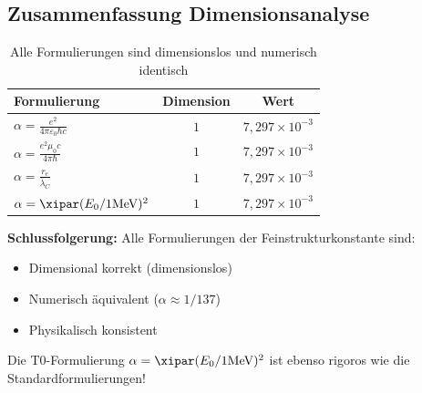 	\subsection{Zusammenfassung Dimensionsanalyse}
	
	\begin{table}[h]
		\centering
		\begin{tabular}{|l|c|c|}
			\hline
			\textbf{Formulierung} & \textbf{Dimension} & \textbf{Wert} \\
			\hline
			$\alpha = \frac{e^2}{4\pi\varepsilon_0\hbar c}$ & $1$ & $7{,}297 \times 10^{-3}$ \\
			$\alpha = \frac{e^2\mu_0 c}{4\pi\hbar}$ & $1$ & $7{,}297 \times 10^{-3}$ \\
			$\alpha = \frac{r_e}{\bar\lambda_C}$ & $1$ & $7{,}297 \times 10^{-3}$ \\
			$\alpha = \xipar(E_0/1\text{MeV})^2$ & $1$ & $7{,}297 \times 10^{-3}$ \\
			\hline
		\end{tabular}
		\caption{Alle Formulierungen sind dimensionslos und numerisch identisch}
	\end{table}
	
	\textbf{Schlussfolgerung:} Alle Formulierungen der Feinstrukturkonstante sind:
	\begin{itemize}
		\item Dimensional korrekt (dimensionslos)
		\item Numerisch äquivalent ($\alpha \approx 1/137$)
		\item Physikalisch konsistent
	\end{itemize}
	
	Die T0-Formulierung $\alpha = \xipar(E_0/1\text{MeV})^2$ ist ebenso rigoros wie die Standardformulierungen!
	
